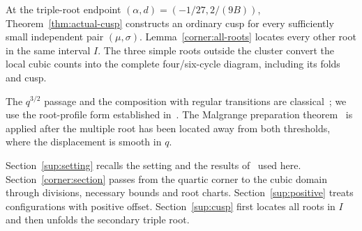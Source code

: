 At the triple-root endpoint $(\alpha,d)=(-1/27,2/(9B))$,
Theorem~\ref{thm:actual-cusp} constructs an ordinary cusp for every
sufficiently small independent pair $(\mu,\sigma)$.
Lemma~\ref{corner:all-roots} locates every other root in the same interval
$I$. The three simple roots outside the cluster convert the local cubic counts
into the complete four/six-cycle diagram, including its folds and cusp.

The $q^{3/2}$ passage and the composition with regular transitions are
classical~\cite{dibbc2001,nordmark2002}; we use the root-profile form
established in~\cite[Section~2]{main2026}. The Malgrange
preparation theorem~\cite[Chapter~IV, Section~2, Theorem~2.1 and Note~(1), p.~95]{golubitsky1973} is applied after the
multiple root has been located away from both thresholds, where the
displacement is smooth in $q$.

Section~\ref{sup:setting} recalls the setting and the results
of~\cite{main2026} used here. Section~\ref{corner:section} passes from the
quartic corner to the cubic domain through divisions, necessary bounds and
root charts. Section~\ref{sup:positive} treats configurations with positive
offset. Section~\ref{sup:cusp} first locates all roots in $I$ and then unfolds
the secondary triple root.

